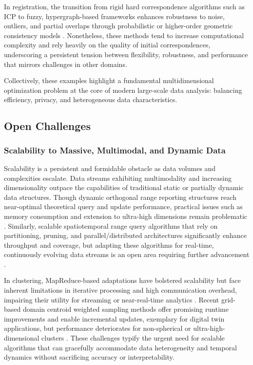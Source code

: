 \documentclass[sigconf]{acmart}
\begin{document}
In registration, the transition from rigid hard correspondence algorithms such as ICP to fuzzy, hypergraph-based frameworks enhances robustness to noise, outliers, and partial overlaps through probabilistic or higher-order geometric consistency models \cite{ref5,ref6}. Nonetheless, these methods tend to increase computational complexity and rely heavily on the quality of initial correspondences, underscoring a persistent tension between flexibility, robustness, and performance that mirrors challenges in other domains.

Collectively, these examples highlight a fundamental multidimensional optimization problem at the core of modern large-scale data analysis: balancing efficiency, privacy, and heterogeneous data characteristics.

\subsection{Open Challenges}

\subsubsection{Scalability to Massive, Multimodal, and Dynamic Data}

Scalability is a persistent and formidable obstacle as data volumes and complexities escalate. Data streams exhibiting multimodality and increasing dimensionality outpace the capabilities of traditional static or partially dynamic data structures. Though dynamic orthogonal range reporting structures reach near-optimal theoretical query and update performance, practical issues such as memory consumption and extension to ultra-high dimensions remain problematic \cite{ref3}. Similarly, scalable spatiotemporal range query algorithms that rely on partitioning, pruning, and parallel/distributed architectures significantly enhance throughput and coverage, but adapting these algorithms for real-time, continuously evolving data streams is an open area requiring further advancement \cite{ref7}.

In clustering, MapReduce-based adaptations have bolstered scalability but face inherent limitations in iterative processing and high communication overhead, impairing their utility for streaming or near-real-time analytics \cite{ref22}. Recent grid-based domain centroid weighted sampling methods offer promising runtime improvements and enable incremental updates, exemplary for digital twin applications, but performance deteriorates for non-spherical or ultra-high-dimensional clusters \cite{ref26}. These challenges typify the urgent need for scalable algorithms that can gracefully accommodate data heterogeneity and temporal dynamics without sacrificing accuracy or interpretability.
\end{document}
